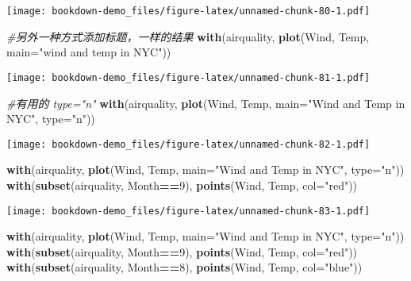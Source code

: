 \documentclass[]{book}
\newenvironment{Shaded}{\begin{snugshade}}{\end{snugshade}}
\newcommand{\CommentTok}[1]{\textcolor[rgb]{0.56,0.35,0.01}{\textit{#1}}}
\newcommand{\DataTypeTok}[1]{\textcolor[rgb]{0.13,0.29,0.53}{#1}}
\newcommand{\DecValTok}[1]{\textcolor[rgb]{0.00,0.00,0.81}{#1}}
\newcommand{\KeywordTok}[1]{\textcolor[rgb]{0.13,0.29,0.53}{\textbf{#1}}}
\newcommand{\NormalTok}[1]{#1}
\newcommand{\OperatorTok}[1]{\textcolor[rgb]{0.81,0.36,0.00}{\textbf{#1}}}
\newcommand{\StringTok}[1]{\textcolor[rgb]{0.31,0.60,0.02}{#1}}
\begin{document}
\texttt{[image: bookdown-demo\_files/figure-latex/unnamed-chunk-80-1.pdf]}

\begin{Shaded}
\begin{Highlighting}[]
\CommentTok{#另外一种方式添加标题，一样的结果}
\KeywordTok{with}\NormalTok{(airquality, }\KeywordTok{plot}\NormalTok{(Wind, Temp,}
     \DataTypeTok{main=}\StringTok{"wind and temp in NYC"}\NormalTok{)) }
\end{Highlighting}
\end{Shaded}

\texttt{[image: bookdown-demo\_files/figure-latex/unnamed-chunk-81-1.pdf]}

\begin{Shaded}
\begin{Highlighting}[]
\CommentTok{#有用的 type="n"}
\KeywordTok{with}\NormalTok{(airquality, }\KeywordTok{plot}\NormalTok{(Wind, Temp,}
                      \DataTypeTok{main=}\StringTok{"Wind and Temp in NYC"}\NormalTok{,}
                      \DataTypeTok{type=}\StringTok{"n"}\NormalTok{))}
\end{Highlighting}
\end{Shaded}

\texttt{[image: bookdown-demo\_files/figure-latex/unnamed-chunk-82-1.pdf]}

\begin{Shaded}
\begin{Highlighting}[]
\KeywordTok{with}\NormalTok{(airquality, }\KeywordTok{plot}\NormalTok{(Wind, Temp,}
                      \DataTypeTok{main=}\StringTok{"Wind and Temp in NYC"}\NormalTok{,}
                      \DataTypeTok{type=}\StringTok{"n"}\NormalTok{))}
\KeywordTok{with}\NormalTok{(}\KeywordTok{subset}\NormalTok{(airquality, Month}\OperatorTok{==}\DecValTok{9}\NormalTok{), }
     \KeywordTok{points}\NormalTok{(Wind, Temp, }\DataTypeTok{col=}\StringTok{"red"}\NormalTok{))}
\end{Highlighting}
\end{Shaded}

\texttt{[image: bookdown-demo\_files/figure-latex/unnamed-chunk-83-1.pdf]}

\begin{Shaded}
\begin{Highlighting}[]
\KeywordTok{with}\NormalTok{(airquality, }\KeywordTok{plot}\NormalTok{(Wind, Temp,}
                      \DataTypeTok{main=}\StringTok{"Wind and Temp in NYC"}\NormalTok{,}
                      \DataTypeTok{type=}\StringTok{"n"}\NormalTok{))}
\KeywordTok{with}\NormalTok{(}\KeywordTok{subset}\NormalTok{(airquality, Month}\OperatorTok{==}\DecValTok{9}\NormalTok{), }
     \KeywordTok{points}\NormalTok{(Wind, Temp, }\DataTypeTok{col=}\StringTok{"red"}\NormalTok{))}
\KeywordTok{with}\NormalTok{(}\KeywordTok{subset}\NormalTok{(airquality, Month}\OperatorTok{==}\DecValTok{8}\NormalTok{), }
     \KeywordTok{points}\NormalTok{(Wind, Temp, }\DataTypeTok{col=}\StringTok{"blue"}\NormalTok{))}
\end{Highlighting}
\end{Shaded}
\end{document}
